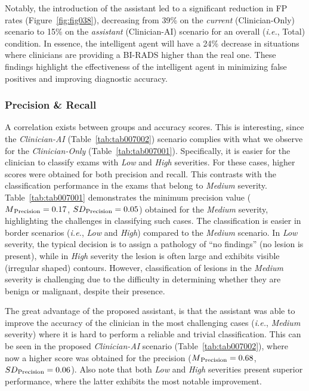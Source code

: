Notably, the introduction of the assistant led to a significant reduction in \ac{FP} rates (Figure~\ref{fig:fig038}), decreasing from 39\% on the {\it current} (Clinician-Only) scenario to 15\% on the {\it assistant} (Clinician-AI) scenario for an overall ({\it i.e.}, Total) condition.
In essence, the intelligent agent will have a 24\% decrease in situations where clinicians are providing a \ac{BI-RADS} higher than the real one.
These findings highlight the effectiveness of the intelligent agent in minimizing false positives and improving diagnostic accuracy.

\subsubsection{Precision \& Recall}
\label{sec:app003004009002}

A correlation exists between groups and accuracy scores.
This is interesting, since the {\it Clinician-AI} (Table~\ref{tab:tab007002}) scenario complies with what we observe for the {\it Clinician-Only} (Table~\ref{tab:tab007001}).
Specifically, it is easier for the clinician to classify exams with {\it Low} and {\it High} severities.
For these cases, higher scores were obtained for both precision and recall.
This contrasts with the classification performance in the exams that belong to {\it Medium} severity.
Table~\ref{tab:tab007001} demonstrates the minimum precision value ($M\textsubscript{Precision} = 0.17$, $SD\textsubscript{Precision} = 0.05$) obtained for the {\it Medium} severity, highlighting the challenges in classifying such cases.
The classification is easier in border scenarios ({\it i.e.}, {\it Low} and {\it High}) compared to the {\it Medium} scenario.
In {\it Low} severity, the typical decision is to assign a pathology of ``no findings'' (no lesion is present), while in {\it High} severity the lesion is often large and exhibits visible (irregular shaped) contours.
However, classification of lesions in the {\it Medium} severity is challenging due to the difficulty in determining whether they are benign or malignant, despite their presence.



The great advantage of the proposed assistant, is that the assistant was able to improve the accuracy of the clinician in the most challenging cases ({\it i.e.}, {\it Medium} severity) where it is hard to perform a reliable and trivial classification.
This can be seen in the proposed {\it Clinician-AI} scenario (Table~\ref{tab:tab007002}), where now a higher score was obtained for the precision ($M\textsubscript{Precision} = 0.68$, $SD\textsubscript{Precision} = 0.06$).
Also note that both {\it Low} and {\it High} severities present superior performance, where the latter exhibits the most notable improvement.

